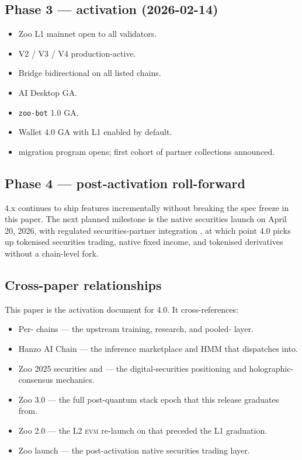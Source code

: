 \subsection{Phase 3 --- activation (2026-02-14)}

\begin{itemize}[leftmargin=1.2em]
  \item Zoo L1 mainnet open to all validators.
  \item \Zoo{} \DEX{} V2 / V3 / V4 production-active.
  \item \Zoo{} Bridge bidirectional on all listed chains.
  \item \Zoo{} AI Desktop GA.
  \item \texttt{zoo-bot} 1.0 GA.
  \item \Lux{} Wallet 4.0 GA with \Zoo{} L1 enabled by default.
  \item \NFT{} migration program opens; first cohort of partner
        collections announced.
\end{itemize}

\subsection{Phase 4 --- post-activation roll-forward}

\Zoo{} 4.x continues to ship features incrementally without breaking
the spec freeze in this paper. The next planned milestone is the
\Zoo{} \DEX{} native securities launch on April 20, 2026, with
regulated securities-partner integration \cite{zoo-dex-launch}, at which
point \Zoo{} 4.0 picks up tokenised securities trading, native
fixed income, and tokenised derivatives without a chain-level fork.

\subsection{Cross-paper relationships}

This paper is the activation document for \Zoo{} 4.0. It cross-references:

\begin{itemize}[leftmargin=1.2em]
  \item Per-\LLM{} chains \cite{zoo-per-llm-chains} --- the upstream
        training, research, and pooled-\GPU{} layer.
  \item Hanzo AI Chain \cite{hanzo-ai-chain} --- the inference
        marketplace and HMM that \Zoo{} dispatches into.
  \item Zoo 2025 securities and \DAO{} \cite{zoo-2025-securities-and-dao}
        --- the digital-securities positioning and holographic-consensus
        \DAO{} mechanics.
  \item Zoo 3.0 \cite{zoo-3-0} --- the full post-quantum stack epoch
        that this release graduates from.
  \item Zoo 2.0 \cite{zoo-2-0} --- the L2 \textsc{evm} re-launch on
        \Lux{} that preceded the L1 graduation.
  \item Zoo \DEX{} launch \cite{zoo-dex-launch} --- the post-activation
        native securities trading layer.
\end{itemize}

